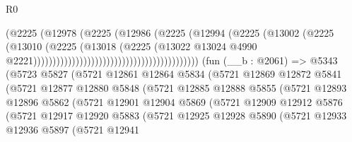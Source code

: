 \begin{lexlean}{R0}
\begin{coremodule}
                                                              (@2225
                                                                (@12978
                                                                  (@2225
                                                                    (@12986
                                                                      (@2225
                                                                        (@12994
                                                                          (@2225
                                                                            (@13002
                                                                              (@2225
                                                                                (@13010
                                                                                  (@2225
                                                                                    (@13018
                                                                                      (@2225
                                                                                        (@13022
                                                                                          @13024
                                                                                          @4990
                                                                                          @2221)))))))))))))))))))))))))))))))))))))))))))
    (fun (__b : @2061) =>
    @5343
      (@5723
        @5827
        (@5721
          @12861
          @12864
          @5834
          (@5721
            @12869
            @12872
            @5841
            (@5721
              @12877
              @12880
              @5848
              (@5721
                @12885
                @12888
                @5855
                (@5721
                  @12893
                  @12896
                  @5862
                  (@5721
                    @12901
                    @12904
                    @5869
                    (@5721
                      @12909
                      @12912
                      @5876
                      (@5721
                        @12917
                        @12920
                        @5883
                        (@5721
                          @12925
                          @12928
                          @5890
                          (@5721
                            @12933
                            @12936
                            @5897
                            (@5721
                              @12941

\end{coremodule}
\end{lexlean}

